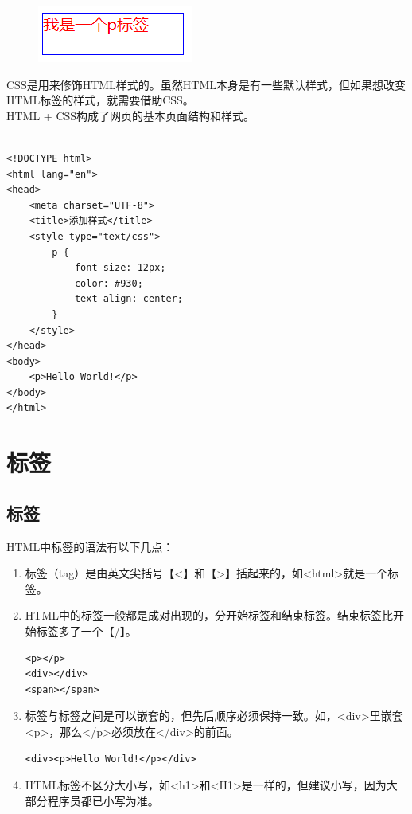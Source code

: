\begin{figure}[H]
	\centering
	\includegraphics[]{img/C1/1-3/2.png}
\end{figure}

CSS是用来修饰HTML样式的。虽然HTML本身是有一些默认样式，但如果想改变HTML标签的样式，就需要借助CSS。\\

HTML + CSS构成了网页的基本页面结构和样式。\\

\\

\begin{lstlisting}[style=htmlcssjs]
<!DOCTYPE html>
<html lang="en">
<head>
    <meta charset="UTF-8">
    <title>添加样式</title>
    <style type="text/css">
        p {
            font-size: 12px;
            color: #930;
            text-align: center;
        }
    </style>
</head>
<body>
    <p>Hello World!</p>
</body>
</html>
\end{lstlisting}

\newpage

\section{标签}

\subsection{标签}

HTML中标签的语法有以下几点：

\begin{enumerate}
	\item 标签（tag）是由英文尖括号【<】和【>】括起来的，如<html>就是一个标签。

	\item HTML中的标签一般都是成对出现的，分开始标签和结束标签。结束标签比开始标签多了一个【/】。\\
	      \begin{lstlisting}[style=htmlcssjs]
<p></p>
<div></div>
<span></span>
    \end{lstlisting}

	\item 标签与标签之间是可以嵌套的，但先后顺序必须保持一致。如，<div>里嵌套<p>，那么</p>必须放在</div>的前面。\\
	      \begin{lstlisting}[style=htmlcssjs]
<div><p>Hello World!</p></div>
    \end{lstlisting}

	\item HTML标签不区分大小写，如<h1>和<H1>是一样的，但建议小写，因为大部分程序员都已小写为准。
\end{enumerate}

